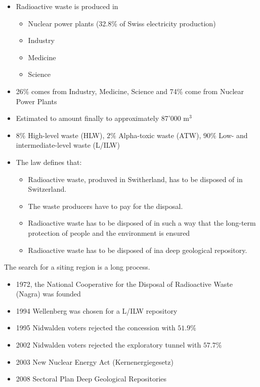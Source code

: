 \begin{itemize}
    \item Radioactive waste is produced in
        \begin{itemize}
            \item Nuclear power plants (32.8\% of Swiss electricity production)
            \item Industry
            \item Medicine
            \item Science
        \end{itemize}
    \item 26\% comes from Industry, Medicine, Science and 74\% come from
        Nuclear Power Plants
    \item Estimated to amount finally to approximately 87'000 m$^3$
    \item $8\%$ High-level waste (HLW), $2\%$ Alpha-toxic waste (ATW),
        $90\%$ Low- and intermediate-level waste (L/ILW)
    \item The law defines that:
        \begin{itemize}
            \item Radioactive waste, produved in Switherland, has to be
                disposed of in Switzerland.
            \item The waste producers have to pay for the disposal.
            \item Radioactive waste has to be disposed of in such a way that
                the long-term protection of people and the environment is
                ensured
            \item Radioactive waste has to be disposed of ina deep geological
                repository.
        \end{itemize}
\end{itemize}

The search for a siting region is a long process.

\begin{itemize}
    \item 1972, the National Cooperative for the Disposal of Radioactive
        Waste (Nagra) was founded
    \item 1994 Wellenberg was chosen for a L/ILW repository
    \item 1995 Nidwalden voters rejected the concession with $51.9\%$
    \item 2002 Nidwalden voters rejected the exploratory tunnel with $57.7\%$
    \item 2003 New Nuclear Energy Act (Kernenergiegesetz)
    \item 2008 Sectoral Plan Deep Geological Repositories
\end{itemize}

